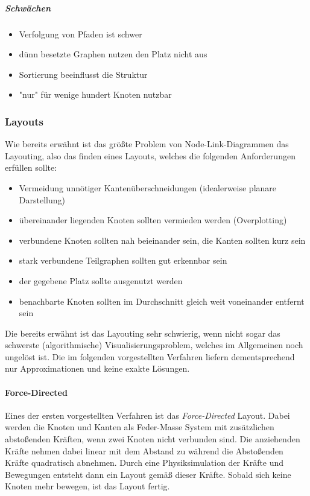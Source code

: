 				\subparagraph{Schwächen}
				\begin{itemize}
					\item Verfolgung von Pfaden ist schwer
					\item dünn besetzte Graphen nutzen den Platz nicht aus
					\item Sortierung beeinflusst die Struktur
					\item "nur" für wenige hundert Knoten nutzbar
				\end{itemize}

			\subsubsection{Layouts}
				Wie bereits erwähnt ist das größte Problem von Node-Link-Diagrammen das Layouting, also das finden eines Layouts, welches die folgenden Anforderungen erfüllen sollte:
				\begin{itemize}
					\item Vermeidung unnötiger Kantenüberschneidungen (idealerweise planare Darstellung)
					\item übereinander liegenden Knoten sollten vermieden werden (Overplotting)
					\item verbundene Knoten sollten nah beieinander sein, \dh die Kanten sollten kurz sein
					\item stark verbundene Teilgraphen sollten gut erkennbar sein
					\item der gegebene Platz sollte ausgenutzt werden
					\item benachbarte Knoten sollten im Durchschnitt gleich weit voneinander entfernt sein
				\end{itemize}
				Die bereits erwähnt ist das Layouting sehr schwierig, wenn nicht sogar das schwerste (algorithmische) Visualisierungsproblem, welches im Allgemeinen noch ungelöst ist. Die im folgenden vorgestellten Verfahren liefern dementsprechend nur Approximationen und keine exakte Lösungen.

				\paragraph{Force-Directed}
					Eines der ersten vorgestellten Verfahren ist das \emph{Force-Directed} Layout. Dabei werden die Knoten und Kanten als Feder-Masse System mit zusätzlichen abstoßenden Kräften, wenn zwei Knoten nicht verbunden sind. Die anziehenden Kräfte nehmen dabei linear mit dem Abstand zu während die Abstoßenden Kräfte quadratisch abnehmen. Durch eine Physiksimulation der Kräfte und Bewegungen entsteht dann ein Layout gemäß dieser Kräfte. Sobald sich keine Knoten mehr bewegen, ist das Layout fertig.

